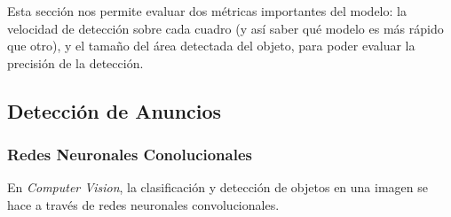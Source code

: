 \documentclass[a4paper]{article}
\begin{document}
\begin{figure}[H]
\end{figure}

Esta sección nos permite evaluar dos métricas importantes del modelo: la velocidad de detección sobre cada cuadro (y así saber qué modelo es más rápido que otro), y el tamaño del área detectada del objeto, para poder evaluar la precisión de la detección.

\subsection{Detección de Anuncios}

\subsubsection{Redes Neuronales Conolucionales}

En \textit{Computer Vision}, la clasificación y detección de objetos en una imagen se hace a través de redes neuronales convolucionales.
\end{document}
